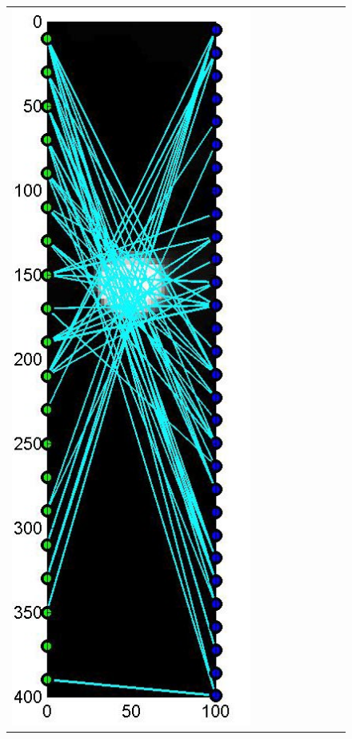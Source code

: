 \documentclass[11pt]{article}
\begin{document}
\begin{figure}[!h]
\begin{center}
\begin{tabular}{|c|c|c|c|c|c|c|c|c|}
			\includegraphics[width=.9\iwidth]{figures/newFigs/noisy/resultsExp-3-designs}
			&

\end{tabular}
\end{center}
\end{figure}
\end{document}
